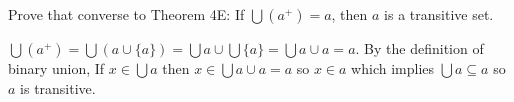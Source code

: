 \documentclass[12pt,letterpaper,boxed]{hmcpset}
\begin{document}
\begin{problem}[4.6]
  Prove that converse to Theorem 4E: If $\bigcup(a^+)=a$, then $a$ is a transitive set.
\end{problem}
\begin{solution}
  $\bigcup(a^+) = \bigcup(a\cup \{a\}) = \bigcup a \cup \bigcup \{a\} = \bigcup a \cup a = a$. By the definition of binary union, If $x\in\bigcup a$ then $x\in \bigcup a\cup a = a$ so $x\in a$ which implies $\bigcup a \subseteq a$ so $a$ is transitive.
\end{solution}
\end{document}
